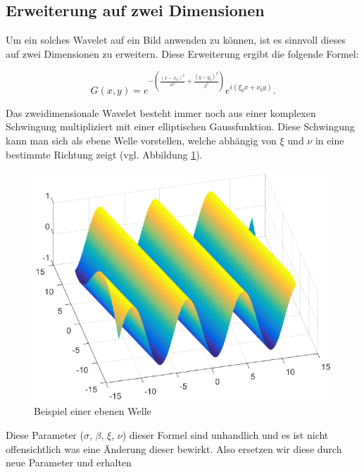 \subsection{Erweiterung auf zwei Dimensionen}

Um ein solches Wavelet auf ein Bild anwenden zu können, ist es sinnvoll dieses auf zwei Dimensionen zu erweitern.
Diese Erweiterung ergibt die folgende Formel:

\begin{equation}
G(x,y)= e^{-(\frac{(x-x_{0})^{2}}{\sigma^{2}}+\frac{(y-y_{0})^{2}}{\beta^{2}})}
e^{i(\xi_{0}x+\nu_{0}y)}.
\end{equation}

Das zweidimensionale Wavelet besteht immer noch aus einer komplexen Schwingung multipliziert mit einer elliptischen Gaussfunktion. 
Diese Schwingung kann man sich als ebene Welle vorstellen, welche abhängig von $\xi$ und $\nu$ in eine bestimmte Richtung zeigt (vgl. Abbildung \ref{fig:planarwave}).

\begin{figure}
	\centering
	\includegraphics[width=0.7\linewidth]{./papers/visuell/images/planarwave.eps}
	\caption{Beispiel einer ebenen Welle}
	\label{fig:planarwave}
\end{figure}



Diese Parameter ($\sigma$, $\beta$, $\xi$, $\nu$) dieser Formel sind unhandlich und es ist nicht offensichtlich was eine Änderung dieser bewirkt.
Also ersetzen wir diese durch neue Parameter und erhalten 

